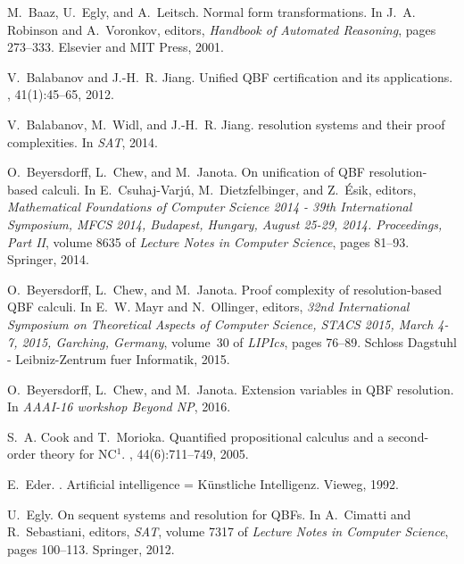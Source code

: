 \documentclass{llncs}
\begin{document}
 
\begin{thebibliography}{10}

M.~Baaz, U.~Egly, and A.~Leitsch.
\newblock Normal form transformations.
\newblock In J.~A. Robinson and A.~Voronkov, editors, {\em Handbook of
  Automated Reasoning}, pages 273--333. Elsevier and MIT Press, 2001.

V.~Balabanov and J.-H.~R. Jiang.
\newblock Unified {QBF} certification and its applications.
, 41(1):45--65, 2012.

V.~Balabanov, M.~Widl, and J.-H.~R. Jiang.
 resolution systems and their proof complexities.
\newblock In {\em SAT}, 2014.

O.~Beyersdorff, L.~Chew, and M.~Janota.
\newblock On unification of {QBF} resolution-based calculi.
\newblock In E.~Csuhaj{-}Varj{\'{u}}, M.~Dietzfelbinger, and Z.~{\'{E}}sik,
  editors, {\em Mathematical Foundations of Computer Science 2014 - 39th
  International Symposium, {MFCS} 2014, Budapest, Hungary, August 25-29, 2014.
  Proceedings, Part {II}}, volume 8635 of {\em Lecture Notes in Computer
  Science}, pages 81--93. Springer, 2014.

O.~Beyersdorff, L.~Chew, and M.~Janota.
\newblock Proof complexity of resolution-based {QBF} calculi.
\newblock In E.~W. Mayr and N.~Ollinger, editors, {\em 32nd International
  Symposium on Theoretical Aspects of Computer Science, {STACS} 2015, March
  4-7, 2015, Garching, Germany}, volume~30 of {\em LIPIcs}, pages 76--89.
  Schloss Dagstuhl - Leibniz-Zentrum fuer Informatik, 2015.

O.~Beyersdorff, L.~Chew, and M.~Janota.
\newblock Extension variables in {QBF} resolution.
\newblock In {\em AAAI-16 workshop Beyond NP}, 2016.

S.~A. Cook and T.~Morioka.
\newblock Quantified propositional calculus and a second-order theory for
  {NC}$^{\mbox{1}}$.
, 44(6):711--749, 2005.

E.~Eder.
.
\newblock Artificial intelligence = K{\"u}nstliche Intelligenz. Vieweg, 1992.

U.~Egly.
\newblock On sequent systems and resolution for {QBFs}.
\newblock In A.~Cimatti and R.~Sebastiani, editors, {\em SAT}, volume 7317 of
  {\em Lecture Notes in Computer Science}, pages 100--113. Springer, 2012.


\end{thebibliography}
\end{document}
